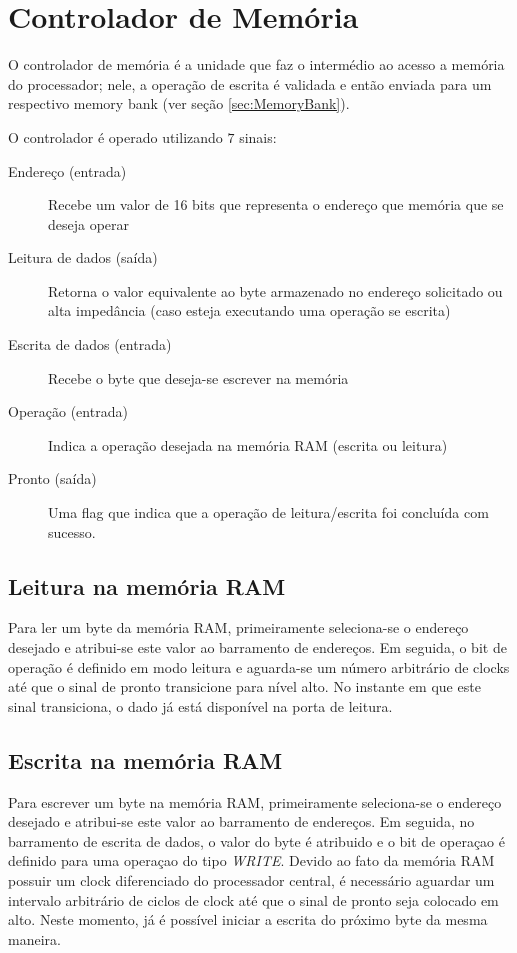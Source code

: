 \documentclass[11pt]{report}
\begin{document}
\section{Controlador de Memória}
\label{sec:MemoryController}
O controlador de memória é a unidade que faz o intermédio ao acesso a memória do processador; nele, a operação de escrita é validada e então enviada para um respectivo memory bank (ver seção \ref{sec:MemoryBank}).

O controlador é operado utilizando $7$ sinais:

\begin{description}
	\item[Endereço (entrada)] Recebe um valor de 16 bits que representa o endereço que memória que se deseja operar
	\item[Leitura de dados (saída)] Retorna o valor equivalente ao byte armazenado no endereço solicitado ou alta impedância (caso esteja executando uma operação se escrita)
	\item[Escrita de dados (entrada)] Recebe o byte que deseja-se escrever na memória
	\item[Operação (entrada)] Indica a operação desejada na memória RAM (escrita ou leitura)
	\item[Pronto (saída)] Uma flag que indica que a operação de leitura/escrita foi concluída com sucesso.
\end{description}

\subsection{Leitura na memória RAM}
Para ler um byte da memória RAM, primeiramente seleciona-se o endereço desejado e atribui-se este valor ao barramento de endereços. Em seguida, o bit de operação é definido em modo leitura e aguarda-se um número arbitrário de clocks até que o sinal de pronto transicione para nível alto. No instante em que este sinal transiciona, o dado já está disponível na porta de leitura.

\subsection{Escrita na memória RAM}
Para escrever um byte na memória RAM, primeiramente seleciona-se o endereço desejado e atribui-se este valor ao barramento de endereços. Em seguida, no barramento de escrita de dados, o valor do byte é atribuido e o bit de operaçao é definido para uma operaçao do tipo \emph{WRITE}. Devido ao fato da memória RAM possuir um clock diferenciado do processador central, é necessário aguardar um intervalo arbitrário de ciclos de clock até que o sinal de pronto seja colocado em alto. Neste momento, já é possível iniciar a escrita do próximo byte da mesma maneira.
\end{document}
